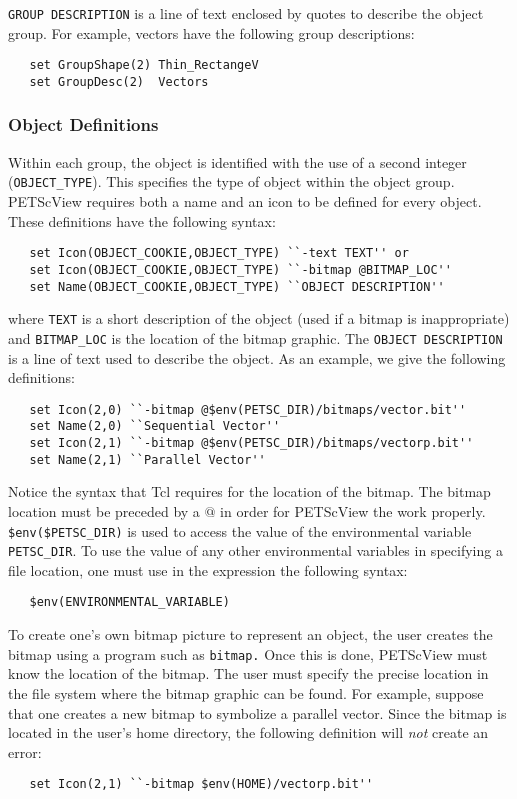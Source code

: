 {\tt GROUP DESCRIPTION} is a line of text enclosed by quotes to describe the object group.  For example, vectors have the following group descriptions:
\begin{verbatim}
   set GroupShape(2) Thin_RectangeV 
   set GroupDesc(2)  Vectors
\end{verbatim}

\subsubsection{Object Definitions}

Within each group, the object is identified with the use of a second integer ({\tt OBJECT\_TYPE}).  This specifies the type of object within the object group.  PETScView requires both a name and an icon to be defined for every object.  These definitions have the following syntax:
\begin{verbatim}
   set Icon(OBJECT_COOKIE,OBJECT_TYPE) ``-text TEXT'' or 
   set Icon(OBJECT_COOKIE,OBJECT_TYPE) ``-bitmap @BITMAP_LOC'' 
   set Name(OBJECT_COOKIE,OBJECT_TYPE) ``OBJECT DESCRIPTION''
\end{verbatim}
where {\tt TEXT} is a short description of the object (used if a bitmap is inappropriate) and {\tt BITMAP\_LOC} is the location of the bitmap graphic.  The {\tt OBJECT DESCRIPTION} is a line of text used to describe the object.  As an example, we give the following definitions:
\begin{verbatim}
   set Icon(2,0) ``-bitmap @$env(PETSC_DIR)/bitmaps/vector.bit'' 
   set Name(2,0) ``Sequential Vector'' 
   set Icon(2,1) ``-bitmap @$env(PETSC_DIR)/bitmaps/vectorp.bit'' 
   set Name(2,1) ``Parallel Vector''
\end{verbatim}
Notice the syntax that Tcl requires for the location of the bitmap.
The bitmap location must be preceded by a $@$ in order for PETScView
the work properly.  {\tt \$env(\$PETSC\_DIR)} is used to access the
value of the environmental variable {\tt PETSC\_DIR}.  To use the
value of any other environmental variables in specifying a file
location, one must use in the expression the following syntax:
\begin{verbatim}
   $env(ENVIRONMENTAL_VARIABLE)
\end{verbatim}

To create one's own bitmap picture to represent an
object, the user creates the bitmap using a program such as {\tt bitmap.}
Once this is done, PETScView must know the location of the
bitmap.  The user must specify the precise location in
the file system where the bitmap graphic can be found.  For example,
suppose that one creates a new bitmap to symbolize a parallel vector.
Since the bitmap is located in the user's home directory, the
following definition will {\em not} create an error:
\begin{verbatim}
   set Icon(2,1) ``-bitmap $env(HOME)/vectorp.bit''
\end{verbatim}

